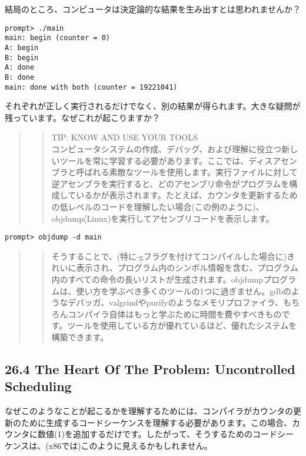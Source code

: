 結局のところ、コンピュータは決定論的な結果を生み出すとは思われませんか？

\begin{verbatim}
prompt> ./main
main: begin (counter = 0)
A: begin
B: begin
A: done
B: done
main: done with both (counter = 19221041)
\end{verbatim}

それぞれが正しく実行されるだけでなく、別の結果が得られます。大きな疑問が残っています。なぜこれが起こりますか？

\begin{quote}
\begin{quote}
TIP: KNOW AND USE YOUR TOOLS\\
コンピュータシステムの作成、デバッグ、および理解に役立つ新しいツールを常に学習する必要があります。ここでは、ディスアセンブラと呼ばれる素敵なツールを使用します。実行ファイルに対して逆アセンブラを実行すると、どのアセンブリ命令がプログラムを構成しているかが表示されます。たとえば、カウンタを更新するための低レベルのコードを理解したい場合(この例のように)、objdump(Linux)を実行してアセンブリコードを表示します。
\end{quote}
\end{quote}

\begin{verbatim}
prompt> objdump -d main
\end{verbatim}

\begin{quote}
\begin{quote}
そうすることで、(特に-gフラグを付けてコンパイルした場合に)きれいに表示され、プログラム内のシンボル情報を含む、プログラム内のすべての命令の長いリストが生成されます。objdumpプログラムは、使い方を学ぶべき多くのツールの1つに過ぎません。gdbのようなデバッガ、valgrindやpurifyのようなメモリプロファイラ、もちろんコンパイラ自体はもっと学ぶために時間を費やすべきものです。ツールを使用している方が優れているほど、優れたシステムを構築できます。
\end{quote}
\end{quote}

\hypertarget{the-heart-of-the-problem-uncontrolled-scheduling}{%
\subsection*{26.4 The Heart Of The Problem: Uncontrolled
Scheduling}\label{the-heart-of-the-problem-uncontrolled-scheduling}}

なぜこのようなことが起こるかを理解するためには、コンパイラがカウンタの更新のために生成するコードシーケンスを理解する必要があります。この場合、カウンタに数値(1)を追加するだけです。したがって、そうするためのコードシーケンスは、(x86では)このように見えるかもしれません。

